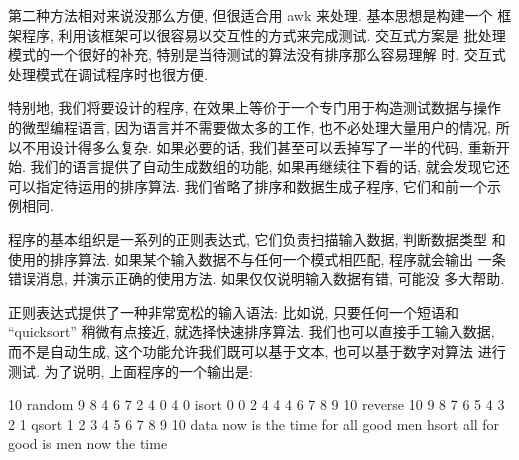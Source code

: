 第二种方法相对来说没那么方便, 但很适合用 awk 来处理. 基本思想是构建一个
框架程序, 利用该框架可以很容易以交互性的方式来完成测试. 交互式方案是
批处理模式的一个很好的补充, 特别是当待测试的算法没有排序那么容易理解
时. 交互式处理模式在调试程序时也很方便.

特别地, 我们将要设计的程序, 在效果上等价于一个专门用于构造测试数据与操作
的微型编程语言, 因为语言并不需要做太多的工作, 也不必处理大量用户的情况,
所以不用设计得多么复杂. 如果必要的话, 我们甚至可以丢掉写了一半的代码,
重新开始. 我们的语言提供了自动生成数组的功能, 如果再继续往下看的话, 
就会发现它还可以指定待运用的排序算法.
我们省略了排序和数据生成子程序, 它们和前一个示例相同.

程序的基本组织是一系列的正则表达式, 它们负责扫描输入数据, 判断数据类型
和使用的排序算法. 如果某个输入数据不与任何一个模式相匹配, 程序就会输出
一条错误消息, 并演示正确的使用方法. 如果仅仅说明输入数据有错, 可能没
多大帮助.

正则表达式提供了一种非常宽松的输入语法: 比如说, 只要任何一个短语和
``quicksort''
稍微有点接近, 就选择快速排序算法. 我们也可以直接手工输入数据, 
而不是自动生成, 这个功能允许我们既可以基于文本, 也可以基于数字对算法
进行测试. 为了说明, 上面程序的一个输出是:
\begin{shell}
    10 random 
     9 8 4 6 7 2 4 0 4 0
    isort 
     0 0 2 4 4 4 6 7 8 9
    10 reverse 
     10 9 8 7 6 5 4 3 2 1
    qsort
     1 2 3 4 5 6 7 8 9 10 
    data now is the time for all good men
    hsort
     all for good is men now the time
\end{shell}

